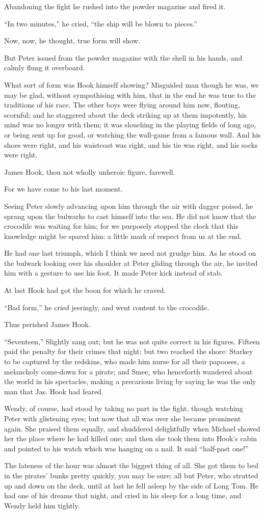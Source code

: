 Abandoning the fight he rushed into the powder magazine and fired it.

``In two minutes,'' he cried, ``the ship will be blown to pieces.''

Now, now, he thought, true form will show.

But Peter issued from the powder magazine with the shell in his hands,
and calmly flung it overboard.

What sort of form was Hook himself showing? Misguided man though he
was, we may be glad, without sympathising with him, that in the end he
was true to the traditions of his race. The other boys were flying
around him now, flouting, scornful; and he staggered about the deck
striking up at them impotently, his mind was no longer with them; it
was slouching in the playing fields of long ago, or being sent up for
good, or watching the wall-game from a famous wall. And his shoes were
right, and his waistcoat was right, and his tie was right, and his
socks were right.

James Hook, thou not wholly unheroic figure, farewell.

For we have come to his last moment.

Seeing Peter slowly advancing upon him through the air with dagger
poised, he sprang upon the bulwarks to cast himself into the sea. He
did not know that the crocodile was waiting for him; for we purposely
stopped the clock that this knowledge might be spared him: a little
mark of respect from us at the end.

He had one last triumph, which I think we need not grudge him. As he
stood on the bulwark looking over his shoulder at Peter gliding through
the air, he invited him with a gesture to use his foot. It made Peter
kick instead of stab.

At last Hook had got the boon for which he craved.

``Bad form,'' he cried jeeringly, and went content to the crocodile.

Thus perished James Hook.

``Seventeen,'' Slightly sang out; but he was not quite correct in his
figures. Fifteen paid the penalty for their crimes that night; but two
reached the shore: Starkey to be captured by the redskins, who made him
nurse for all their papooses, a melancholy come-down for a pirate; and
Smee, who henceforth wandered about the world in his spectacles, making
a precarious living by saying he was the only man that Jas. Hook had
feared.

Wendy, of course, had stood by taking no part in the fight, though
watching Peter with glistening eyes; but now that all was over she
became prominent again. She praised them equally, and shuddered
delightfully when Michael showed her the place where he had killed one;
and then she took them into Hook's cabin and pointed to his watch which
was hanging on a nail. It said ``half-past one!''

The lateness of the hour was almost the biggest thing of all. She got
them to bed in the pirates' bunks pretty quickly, you may be sure; all
but Peter, who strutted up and down on the deck, until at last he fell
asleep by the side of Long Tom. He had one of his dreams that night,
and cried in his sleep for a long time, and Wendy held him tightly.
